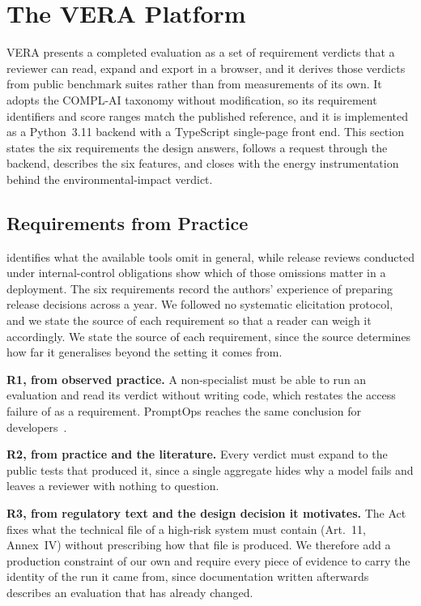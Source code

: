 \documentclass[10pt,conference]{IEEEtran}
\begin{document}
\section{The VERA Platform}
\label{sec:vera}
VERA presents a completed evaluation as a set of requirement verdicts that a reviewer can read, expand and export in a browser, and it derives those verdicts from public benchmark suites rather than from measurements of its own.
It adopts the COMPL-AI taxonomy without modification, so its requirement identifiers and score ranges match the published reference, and it is implemented as a Python~3.11 backend with a TypeScript single-page front end.
This section states the six requirements the design answers, follows a request through the backend, describes the six features, and closes with the energy instrumentation behind the environmental-impact verdict.

\subsection{Requirements from Practice}
\label{sec:requirements}
 identifies what the available tools omit in general, while release reviews conducted under internal-control obligations show which of those omissions matter in a deployment.
The six requirements record the authors' experience of preparing release decisions across a year. We followed no systematic elicitation protocol, and we state the source of each requirement so that a reader can weigh it accordingly.
We state the source of each requirement, since the source determines how far it generalises beyond the setting it comes from.

\textbf{R1, from observed practice.}
A non-specialist must be able to run an evaluation and read its verdict without writing code, which restates the access failure of  as a requirement.
PromptOps reaches the same conclusion for developers~\cite{sunetnanta2025promptops}.

\textbf{R2, from practice and the literature.}
Every verdict must expand to the public tests that produced it, since a single aggregate hides why a model fails and leaves a reviewer with nothing to question.

\textbf{R3, from regulatory text and the design decision it motivates.}
The Act fixes what the technical file of a high-risk system must contain (Art.~11, Annex~IV) without prescribing how that file is produced.
We therefore add a production constraint of our own and require every piece of evidence to carry the identity of the run it came from, since documentation written afterwards describes an evaluation that has already changed.
\end{document}
